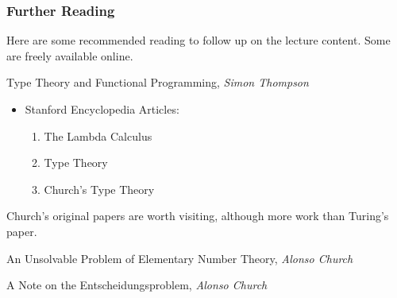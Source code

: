 \documentclass{beamer}
\begin{document}
\begin{frame}
	\frametitle{Further Reading}
	
	Here are some recommended reading to follow up on the lecture content. Some are freely available online. 

	\vspace{0.4cm}

	Type Theory and Functional Programming, \emph{Simon Thompson}
	
	\vspace{0.1cm}
	
	\begin{itemize}
		\item Stanford Encyclopedia Articles: 
			\begin{enumerate}
				\item The Lambda Calculus
				\item Type Theory
				\item Church's Type Theory
			\end{enumerate}
	\end{itemize}

	Church's original papers are worth visiting, although more work than Turing's paper. 

	An Unsolvable Problem of Elementary Number Theory, \emph{Alonso Church}

	\vspace{0.2cm}

	A Note on the Entscheidungsproblem, \emph{Alonso Church}
	
\end{frame}
\end{document}
